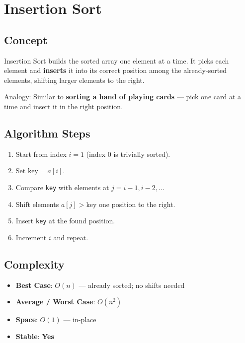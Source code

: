 \documentclass[12pt,a4paper]{article}
\begin{document}
\newpage

\section{Insertion Sort}

\subsection{Concept}
Insertion Sort builds the sorted array one element at a time. It picks each element and \textbf{inserts} it into its correct position among the already-sorted elements, shifting larger elements to the right.

Analogy: Similar to \textbf{sorting a hand of playing cards} — pick one card at a time and insert it in the right position.

\subsection{Algorithm Steps}
\begin{enumerate}
    \item Start from index $i = 1$ (index 0 is trivially sorted).
    \item Set $\text{key} = a[i]$.
    \item Compare \texttt{key} with elements at $j = i-1, i-2, \ldots$
    \item Shift elements $a[j] > \text{key}$ one position to the right.
    \item Insert \texttt{key} at the found position.
    \item Increment $i$ and repeat.
\end{enumerate}

\subsection{Complexity}
\begin{itemize}
    \item \textbf{Best Case}: $O(n)$ — already sorted; no shifts needed
    \item \textbf{Average / Worst Case}: $O(n^2)$
    \item \textbf{Space}: $O(1)$ — in-place
    \item \textbf{Stable}: \textbf{Yes}
\end{itemize}
\end{document}
